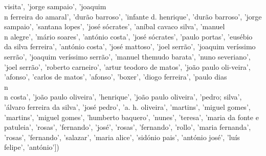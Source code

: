 \documentclass{article}
\begin{document}
\begin{itemize}
visita', 'jorge sampaio', 'joaquim\\n ferreira do amaral', 'durão barroso', 'infante d. henrique', 'durão barroso', 'jorge sampaio', 'santana lopes', 'josé sócrates', 'aníbal cavaco silva', 'manuel\\n alegre', 'mário soares', 'antónio costa', 'josé sócrates', 'paulo portas', 'eusébio da silva ferreira', 'antónio costa', 'josé mattoso', 'joel serrão', 'joaquim veríssimo serrão', 'joaquim veríssimo serrão', 'manuel themudo barata', 'nuno severiano', 'joel serrão', 'roberto carneiro', 'artur teodoro de matos', 'joão paulo oli-veira', 'afonso', 'carlos de matos', 'afonso', 'boxer', 'diogo ferreira', 'paulo dias\\n\\n costa', 'joão paulo oliveira', 'henrique', 'joão paulo oliveira', 'pedro; silva', 'álvaro ferreira da silva', 'josé pedro', 'a. h. oliveira', 'martins', 'miguel gomes', 'martins', 'miguel gomes', 'humberto baquero', 'nunes', 'teresa', 'maria da fonte e patuleia', 'rosas', 'fernando', 'josé', 'rosas', 'fernando', 'rollo', 'maria fernanda', 'rosas', 'fernando', 'salazar', 'maria alice', 'sidónio pais', 'antónio josé', 'luís felipe', 'antónio'])

\end{itemize}
\end{document}
